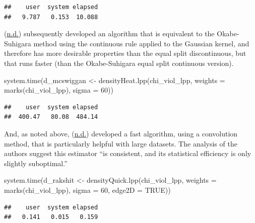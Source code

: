 \documentclass[
  krantz2]{krantz}
\makeatletter
\newenvironment{Shaded}{\begin{snugshade}}{\end{snugshade}}
\newcommand{\AttributeTok}[1]{\textcolor[rgb]{0.61,0.61,0.61}{#1}}
\newcommand{\ConstantTok}[1]{\textcolor[rgb]{0,0,0}{#1}}
\newcommand{\DecValTok}[1]{\textcolor[rgb]{0.06,0.06,0.06}{#1}}
\newcommand{\FunctionTok}[1]{\textcolor[rgb]{0,0,0}{#1}}
\newcommand{\NormalTok}[1]{#1}
\newcommand{\OtherTok}[1]{\textcolor[rgb]{0.37,0.37,0.37}{#1}}
\newenvironment{kframe}{%
\medskip{}
\setlength{\fboxsep}{.8em}
 \def\at@end@of@kframe{}%
 \ifinner\ifhmode%
  \def\at@end@of@kframe{\end{minipage}}%
  \begin{minipage}{\columnwidth}%
 \fi\fi%
 \def\FrameCommand##1{\hskip\@totalleftmargin \hskip-\fboxsep
 \colorbox{shadecolor}{##1}\hskip-\fboxsep
     \hskip-\linewidth \hskip-\@totalleftmargin \hskip\columnwidth}%
 \MakeFramed {\advance\hsize-\width
   \@totalleftmargin\z@ \linewidth\hsize
   \@setminipage}}%
 {\par\unskip\endMakeFramed%
 \at@end@of@kframe}
\renewenvironment{Shaded}{\begin{kframe}}{\end{kframe}}
\makeatother
\begin{document}
\begin{verbatim}
##    user  system elapsed 
##   9.787   0.153  10.088
\end{verbatim}

(\protect\hyperlink{ref-McSwiggan_2016}{n.d.}) subsequently developed an algorithm that is equivalent to the Okabe-Suhigara method using the continuous rule applied to the Gaussian kernel, and therefore has more desirable properties than the equal split discontinuous, but that runs faster (than the Okabe-Suhigara equal split continuous version).

\begin{Shaded}
\begin{Highlighting}[]
\FunctionTok{system.time}\NormalTok{(d\_mcswiggan }\OtherTok{\textless{}{-}} \FunctionTok{densityHeat.lpp}\NormalTok{(chi\_viol\_lpp, }
                                    \AttributeTok{weights =} \FunctionTok{marks}\NormalTok{(chi\_viol\_lpp), }
                                    \AttributeTok{sigma =} \DecValTok{60}\NormalTok{))}
\end{Highlighting}
\end{Shaded}

\begin{verbatim}
##    user  system elapsed 
##  400.47   80.08  484.14
\end{verbatim}

And, as noted above, (\protect\hyperlink{ref-Rakshit_2019}{n.d.}) developed a fast algorithm, using a convolution method, that is particularly helpful with large datasets. The analysis of the authors suggest this estimator ``is consistent, and its statistical efficiency is only slightly suboptimal.''

\begin{Shaded}
\begin{Highlighting}[]
\FunctionTok{system.time}\NormalTok{(d\_rakshit }\OtherTok{\textless{}{-}} \FunctionTok{densityQuick.lpp}\NormalTok{(chi\_viol\_lpp, }
                                    \AttributeTok{weights =} \FunctionTok{marks}\NormalTok{(chi\_viol\_lpp), }
                                    \AttributeTok{sigma =} \DecValTok{60}\NormalTok{,}
                                    \AttributeTok{edge2D =} \ConstantTok{TRUE}\NormalTok{))}
\end{Highlighting}
\end{Shaded}

\begin{verbatim}
##    user  system elapsed 
##   0.141   0.015   0.159
\end{verbatim}
\end{document}
